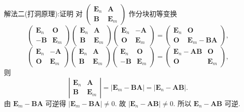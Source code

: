 \documentclass[../../main.tex]{subfiles}
\begin{document}
\begin{solution}
{\color{blue}解法二(打洞原理):}证明 对 $\begin{pmatrix} \boldsymbol{E}_n & \boldsymbol{A} \\ \boldsymbol{B} & \boldsymbol{E}_m \end{pmatrix}$ 作分块初等变换
\[
\begin{pmatrix} \boldsymbol{E}_n & \boldsymbol{O} \\ -\boldsymbol{B} & \boldsymbol{E}_m \end{pmatrix} \begin{pmatrix} \boldsymbol{E}_n & \boldsymbol{A} \\ \boldsymbol{B} & \boldsymbol{E}_m \end{pmatrix} \begin{pmatrix} \boldsymbol{E}_n & -\boldsymbol{A} \\ \boldsymbol{O} & \boldsymbol{E}_m \end{pmatrix} = \begin{pmatrix} \boldsymbol{E}_n & \boldsymbol{O} \\ \boldsymbol{O} & \boldsymbol{E}_m - \boldsymbol{BA} \end{pmatrix},
\]
\[
\begin{pmatrix} \boldsymbol{E}_n & -\boldsymbol{A} \\ \boldsymbol{O} & \boldsymbol{E}_m \end{pmatrix} \begin{pmatrix} \boldsymbol{E}_n & \boldsymbol{A} \\ \boldsymbol{B} & \boldsymbol{E}_m \end{pmatrix} \begin{pmatrix} \boldsymbol{E}_n & \boldsymbol{O} \\ -\boldsymbol{B} & \boldsymbol{E}_m \end{pmatrix} = \begin{pmatrix} \boldsymbol{E}_n - \boldsymbol{AB} & \boldsymbol{O} \\ \boldsymbol{O} & \boldsymbol{E}_m \end{pmatrix},
\]
则
\[
\left| \begin{matrix} \boldsymbol{E}_n & \boldsymbol{A} \\ \boldsymbol{B} & \boldsymbol{E}_m \end{matrix} \right| = |\boldsymbol{E}_m - \boldsymbol{BA}| = |\boldsymbol{E}_n - \boldsymbol{AB}|.
\]
由 $\boldsymbol{E}_m - \boldsymbol{BA}$ 可逆得 $|\boldsymbol{E}_m - \boldsymbol{BA}| \neq 0$. 故 $|\boldsymbol{E}_n - \boldsymbol{AB}| \neq 0$. 所以 $\boldsymbol{E}_n - \boldsymbol{AB}$ 可逆.


\end{solution}
\end{document}
